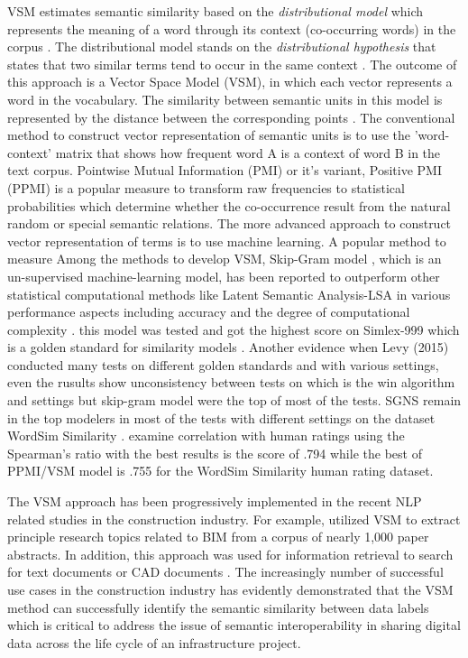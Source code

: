 \documentclass[Journal,InsideFigs, DoubleSpace]{ascelike} %
\begin{document}
\par
VSM estimates semantic similarity based on the \textit{distributional model} which represents the meaning of a word through its context (co-occurring words) in the corpus \cite{erk12}. The distributional model stands on the \textit{distributional hypothesis} that states that two similar terms tend to occur in the same context \cite{Harris54}. The outcome of this approach is a Vector Space Model (VSM), in which each vector represents a word in the vocabulary. The similarity between semantic units in this model is represented by the distance between the corresponding points \cite{erk12}. The conventional method to construct vector representation of semantic units is to use the 'word-context' matrix that shows how frequent word A is a context of word B in the text corpus. Pointwise Mutual Information (PMI) \cite{church90} or it's variant, Positive PMI (PPMI) is a popular measure to transform raw frequencies to statistical probabilities which determine whether the co-occurrence result from the natural random or special semantic relations. The more advanced approach to construct vector representation of terms is to use machine learning. A popular method to measure Among the methods to develop VSM, Skip-Gram model \cite{mikolov13a}, which is an un-supervised machine-learning model, has been reported to outperform other statistical computational methods like Latent Semantic Analysis-LSA \cite{landauer1997solution} in various performance aspects including accuracy and the degree of computational complexity \cite{mikolov13a}. this model was tested and got the highest score on Simlex-999 which is a golden standard for similarity models \cite{hill15}. Another evidence when Levy (2015) conducted many tests on different golden standards and with various settings, even the rusults show unconsistency between tests on which is the win algorithm and settings but skip-gram model were the top of most of the tests. SGNS remain in the top modelers in most of the tests with different settings on the dataset WordSim Similarity \cite{levy15}. examine correlation with human ratings using the Spearman's ratio with the best results is the score of .794 while the best of PPMI/VSM model is .755 for the WordSim Similarity human rating dataset.  
\par
The VSM approach has been progressively implemented in the recent NLP related studies in the construction industry. For example,  utilized VSM to extract principle research topics related to BIM from a corpus of nearly 1,000 paper abstracts. In addition, this approach was used for information retrieval to search for text documents \cite{lv15} or CAD documents \cite{hsu13}. The increasingly number of successful use cases in the construction industry has evidently demonstrated that the VSM method can successfully identify the semantic similarity between data labels which is critical to address the issue of semantic interoperability in sharing digital data across the life cycle of an infrastructure project.
\par
% 
\end{document}
